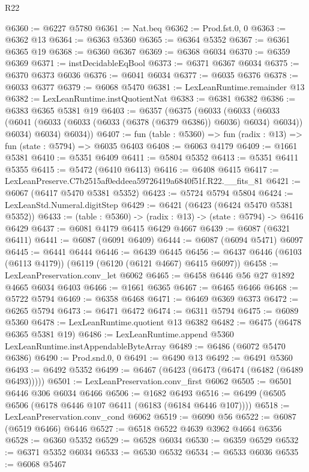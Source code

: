 \begin{lexlean}{R22}
\begin{coremodule}
@6360 := @6227 @5780
@6361 := Nat.beq
@6362 := Prod.fst.{0, 0}
@6363 := @6362 @13
@6364 := @6363 @5360
@6365 := @6364 @5352
@6367 := @6361 @6365 @19
@6368 := @6360 @6367
@6369 := @6368 @6034
@6370 := @6359 @6369
@6371 := instDecidableEqBool
@6373 := @6371 @6367 @6034
@6375 := @6370 @6373 @6036
@6376 := @6041 @6034
@6377 := @6035 @6376
@6378 := @6033 @6377
@6379 := @6068 @5470
@6381 := LexLeanRuntime.remainder @13
@6382 := LexLeanRuntime.instQuotientNat
@6383 := @6381 @6382
@6386 := @6383 @6365 @5381 @19
@6403 := @6357
    (@6375
      (@6033
        (@6033
          (@6033 (@6041 (@6033 (@6033 (@6033 (@6378 (@6379 @6386)) @6036) @6034) @6034)) @6034)
          @6034)
        @6034))
@6407 := fun (table : @5360) => fun (radix : @13) => fun (state : @5794) => @6035 @6403
@6408 := @6063 @4179
@6409 := @1661 @5381
@6410 := @5351 @6409
@6411 := @5804 @5352
@6413 := @5351 @6411 @5355
@6415 := @5472 (@6410 @6413)
@6416 := @6408 @6415
@6417 := LexLeanPreserve.C7b2515af0eddeea59726419a6840f51f.R22.__fits_81
@6421 := @6067 (@6417 @5470 @5381 @5352)
@6423 := @5724 @5794 @5804
@6424 := LexLeanStd.Numeral.digitStep
@6429 := @6421 (@6423 (@6424 @5470 @5381 @5352))
@6433 := (table : @5360) -> (radix : @13) -> (state : @5794) -> @6416 @6429
@6437 := @6081 @4179 @6415 @6429 @4667
@6439 := @6087 (@6321 @6411)
@6441 := @6087 (@6091 @6409)
@6444 := @6087 (@6094 @5471) @6097
@6445 := @6441 @6444
@6446 := @6439 @6445
@6456 := @6437 @6446 (@6103 (@6113 @4179)) (@6119 (@6120 (@6121 @4667) @6415 @6097))
@6458 := LexLeanPreservation.conv_let @6062
@6465 := @6458 @6446 @56 @27 @1892 @4665 @6034 @6403
@6466 := @1661 @6365
@6467 := @6465 @6466
@6468 := @5722 @5794
@6469 := @6358 @6468
@6471 := @6469 @6369 @6373
@6472 := @6265 @5794
@6473 := @6471 @6472
@6474 := @6311 @5794
@6475 := @6089 @5360
@6478 := LexLeanRuntime.quotient @13 @6382
@6482 := @6475 (@6478 @6365 @5381 @19)
@6486 := LexLeanRuntime.append @5360 LexLeanRuntime.instAppendableByteArray
@6489 := @6486 (@6072 @5470 @6386)
@6490 := Prod.snd.{0, 0}
@6491 := @6490 @13
@6492 := @6491 @5360
@6493 := @6492 @5352
@6499 := @6467 (@6423 (@6473 (@6474 (@6482 (@6489 @6493)))))
@6501 := LexLeanPreservation.conv_first @6062
@6505 := @6501 @6446 @306 @6034 @6466
@6506 := @1682 @6493
@6516 := @6499 (@6505 @6506 (@6178 @6446 @107 @6411 (@6183 (@6184 @6446 @107))))
@6518 := LexLeanPreservation.conv_cond @6062
@6519 := @6090 @56
@6522 := @6087 (@6519 @6466) @6446
@6527 := @6518 @6522 @4639 @3962 @4664 @6356
@6528 := @6360 @5352
@6529 := @6528 @6034
@6530 := @6359 @6529
@6532 := @6371 @5352 @6034
@6533 := @6530 @6532
@6534 := @6533 @6036
@6535 := @6068 @5467

\end{coremodule}
\end{lexlean}
